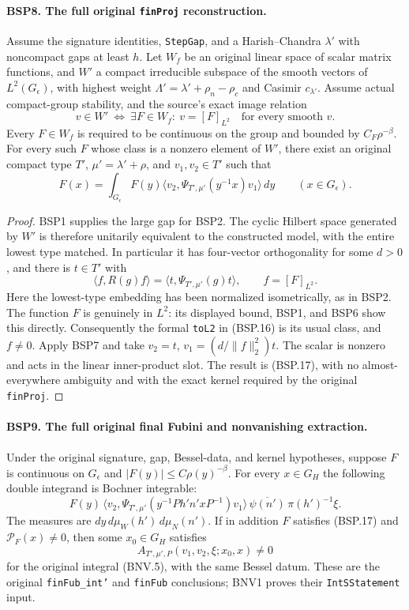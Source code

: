 \paragraph{BSP8. The full original \texttt{finProj} reconstruction.}
\label{claim:BSP8}
Assume the signature identities, \texttt{StepGap}, and a Harish--Chandra
$\lambda'$ with noncompact gaps at least $h$.
Let $W_f$ be an original linear space of scalar matrix functions, and
$W'$ a compact irreducible subspace of the smooth vectors of
$L^2(G_\epsilon)$, with highest weight
$\Lambda'=\lambda'+\rho_n-\rho_c$ and Casimir $c_{\lambda'}$.
Assume actual compact-group stability, and the source's exact image
relation
\[
 v\in W'\ \Longleftrightarrow\
 \exists F\in W_f:\ v=[F]_{L^2}
 \quad\text{for every smooth }v.
 \tag{BSP.16}
\]
Every $F\in W_f$ is required to be continuous on the group and bounded
by $C_F\rho^{-\beta}$.
For every such $F$ whose class is a nonzero element of $W'$, there
exist an original compact type $T'$, $\mu'=\lambda'+\rho$, and
$v_1,v_2\in T'$ such that
\[
 F(x)=\int_{G_\epsilon}F(y)
      \langle v_2,\Psi_{T',\mu'}(y^{-1}x)v_1\rangle\,dy
       \qquad(x\in G_\epsilon).
 \tag{BSP.17}
\]

\begin{proof}
BSP1 supplies the large gap for BSP2.
The cyclic Hilbert space generated by $W'$ is therefore unitarily
equivalent to the constructed model, with the entire lowest type
matched.  In particular it has four-vector orthogonality for some
$d>0$, and there is $t\in T'$ with
\[
 \langle f,R(g)f\rangle
       =\langle t,\Psi_{T',\mu'}(g)t\rangle,\qquad f=[F]_{L^2}.
\]
Here the lowest-type embedding has been normalized isometrically,
as in BSP2.  The function $F$ is genuinely in $L^2$:
its displayed bound, BSP1, and BSP6 show this directly.
Consequently the formal \texttt{toL2} in (BSP.16) is its usual class,
and $f\ne0$.
Apply BSP7 and take
$v_2=t$, $v_1=(d/\|f\|_2^2)t$.
The scalar is nonzero and acts in the linear inner-product slot.
The result is (BSP.17), with no almost-everywhere ambiguity and with
the exact kernel required by the original \texttt{finProj}.
\end{proof}

\paragraph{BSP9. The full original final Fubini and nonvanishing extraction.}
\label{claim:BSP9}
Under the original signature, gap, Bessel-data, and kernel hypotheses,
suppose $F$ is continuous on $G_\epsilon$ and
$|F(y)|\le C\rho(y)^{-\beta}$.
For every $x\in G_H$ the following double integrand is Bochner integrable:
\[
 F(y)\,
 \langle v_2,\Psi_{T',\mu'}
        (y^{-1}P h'n'xP^{-1})v_1\rangle\,
 \overline{\psi(n')}\,\pi(h')^{-1}\xi.
 \tag{BSP.18}
\]
The measures are $dy\,d\mu_W(h')\,d\mu_N(n')$.
If in addition $F$ satisfies (BSP.17) and
$\mathcal P_F(x)\ne0$, then some $x_0\in G_H$ satisfies
\[
 A_{T',\mu',P}(v_1,v_2,\xi;x_0,x)\ne0
 \tag{BSP.19}
\]
for the original integral (BNV.5), with the same Bessel datum.
These are the original \texttt{finFub\_int'} and \texttt{finFub}
conclusions; BNV1 proves their \texttt{IntSStatement} input.


